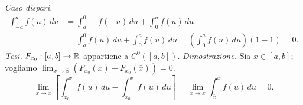 \textit{Caso dispari.}
\begin{align*}
\int_{-a}^af(u)\,du&=\int_a^0-f(-u)\,du+\int_0^af(u)\,du\\
&=\int_a^0f(u)\,du+\int_0^af(u)\,du
=\left(\int_0^af(u)\,du\right)(1-1)=0.
\end{align*}
\textit{Tesi.} $F_{x_0}:[a,b]\to\mathbb R$ appartiene a $C^0([a,b])$.
\textit{Dimostrazione.} Sia $\bar x\in[a,b]$; vogliamo $\lim_{x\to\bar x}(F_{x_0}(x)-F_{x_0}(\bar x))=0$.
\[\lim_{x\to\bar x}\left[\int_{x_0}^xf(u)\,du-\int_{x_0}^{\bar x}f(u)\,du\right]
=\lim_{x\to\bar x}\int_{\bar x}^xf(u)\,du=0.\]
